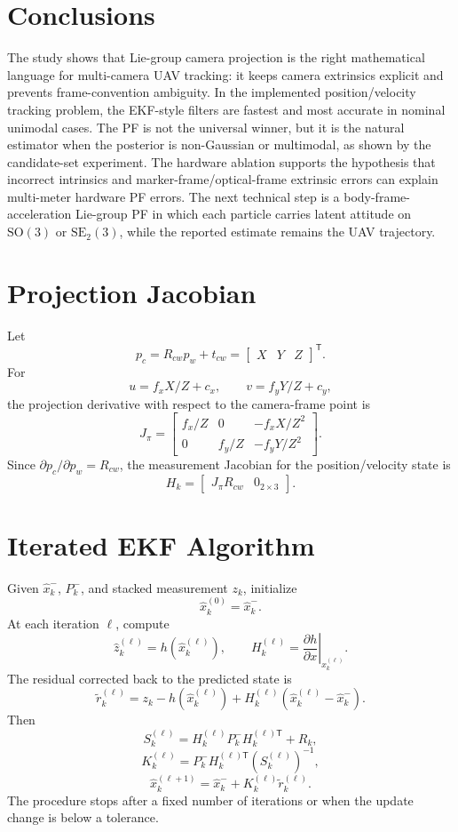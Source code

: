 \documentclass{aiaa-tc}
\newcommand{\SO}{\mathrm{SO}}
\newcommand{\SE}{\mathrm{SE}}
\newcommand{\T}{\mathsf{T}}
\begin{document}
\section{Conclusions}

The study shows that Lie-group camera projection is the right mathematical
language for multi-camera UAV tracking: it keeps camera extrinsics explicit and
prevents frame-convention ambiguity.  In the implemented position/velocity
tracking problem, the EKF-style filters are fastest and most accurate in
nominal unimodal cases.  The PF is not the universal winner, but it is the
natural estimator when the posterior is non-Gaussian or multimodal, as shown by
the candidate-set experiment.  The hardware ablation supports the hypothesis
that incorrect intrinsics and marker-frame/optical-frame extrinsic errors can
explain multi-meter hardware PF errors.  The next technical step is a
body-frame-acceleration Lie-group PF in which each particle carries latent
attitude on \(\SO(3)\) or \(\SE_2(3)\), while the reported estimate remains the
UAV trajectory.

\appendix

\section{Projection Jacobian}

Let
\[
p_c=R_{cw}p_w+t_{cw}=
\begin{bmatrix}X&Y&Z\end{bmatrix}^{\T}.
\]
For
\[
u=f_xX/Z+c_x,
\qquad
v=f_yY/Z+c_y,
\]
the projection derivative with respect to the camera-frame point is
\[
J_{\pi}
=
\begin{bmatrix}
f_x/Z & 0 & -f_xX/Z^2\\
0 & f_y/Z & -f_yY/Z^2
\end{bmatrix}.
\]
Since \(\partial p_c/\partial p_w=R_{cw}\), the measurement Jacobian for the
position/velocity state is
\[
H_k
=
\begin{bmatrix}
J_{\pi}R_{cw} & 0_{2\times 3}
\end{bmatrix}.
\]

\section{Iterated EKF Algorithm}

Given \(\hat x^-_k\), \(P^-_k\), and stacked measurement \(z_k\), initialize
\[
\hat x_k^{(0)}=\hat x^-_k.
\]
At each iteration \(\ell\), compute
\[
\hat z_k^{(\ell)}=h(\hat x_k^{(\ell)}),
\qquad
H_k^{(\ell)}
=
\left.\frac{\partial h}{\partial x}\right|_{\hat x_k^{(\ell)}}.
\]
The residual corrected back to the predicted state is
\[
\tilde r_k^{(\ell)}
=
z_k-h(\hat x_k^{(\ell)})
+H_k^{(\ell)}
(\hat x_k^{(\ell)}-\hat x^-_k).
\]
Then
\[
S_k^{(\ell)}
=
H_k^{(\ell)}P^-_kH_k^{(\ell)\T}+R_k,
\]
\[
K_k^{(\ell)}
=
P^-_kH_k^{(\ell)\T}
\left(S_k^{(\ell)}\right)^{-1},
\]
\[
\hat x_k^{(\ell+1)}
=
\hat x^-_k+
K_k^{(\ell)}\tilde r_k^{(\ell)}.
\]
The procedure stops after a fixed number of iterations or when the update
change is below a tolerance.
\end{document}
